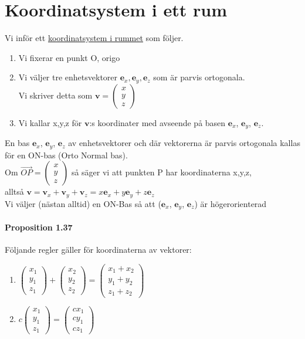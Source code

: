 \section{Koordinatsystem i ett rum}
Vi inför ett \underline{koordinatsystem i rummet} som följer.
\begin{enumerate}
    \item Vi fixerar en punkt O, origo
    \item Vi väljer tre enhetsvektorer $\bm{e}_{x},\bm{e}_{y}, \bm{e}_{z}$ som är parvis ortogonala.\\ 
        Vi skriver detta som $\bm{v}=\begin{pmatrix}x\\y\\z\end{pmatrix}$
    \item Vi kallar x,y,z för $\bm{v}$:s koordinater med avseende på basen $\bm{e}_{x}$, $\bm{e}_{y}$, $\bm{e}_{z}$.
\end{enumerate}
En bas $\bm{e}_{x}$, $\bm{e}_{y}$, $\bm{e}_{z}$ av enhetsvektorer och där vektorerna är parvis ortogonala kallas för en ON-bas (Orto Normal bas).\\
Om $\overrightarrow{OP}=\begin{pmatrix}x\\y\\z\end{pmatrix}$ så säger vi att punkten P har koordinaterna x,y,z,\\
alltså $\bm{v}=\bm{v}_{x} + \bm{v}_{y} + \bm{v}_{z} = x\bm{e}_{x} + y\bm{e}_{y} + z\bm{e}_{z}$\\
Vi väljer (nästan alltid) en ON-Bas så att ($\bm{e}_{x}$, $\bm{e}_{y}$, $\bm{e}_{z}$) är högerorienterad

\paragraph{Proposition 1.37} Följande regler gäller för koordinaterna av vektorer:
\begin{enumerate}
    \item $\begin{pmatrix}x_{1}\\y_{1}\\z_{1}\end{pmatrix}+\begin{pmatrix}x_{2}\\y_{2}\\z_{2}\end{pmatrix}=\begin{pmatrix}x_{1}+x_{2}\\y_{1}+y_{2}\\z_{1}+z_{2}\end{pmatrix}$
    \item $c\begin{pmatrix}x_{1}\\y_{1}\\z_{1}\end{pmatrix}=\begin{pmatrix}cx_{1}\\cy_{1}\\cz_{1}\end{pmatrix}$
\end{enumerate}

